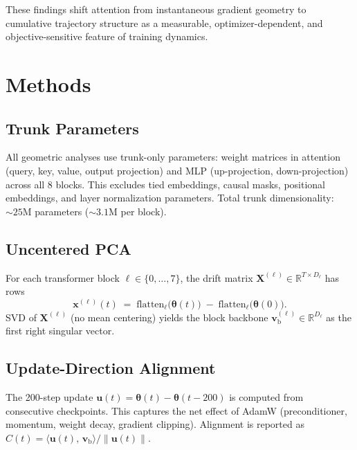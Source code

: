 \documentclass[11pt,a4paper]{article}
\newcommand{\vb}{\mathbf{v}_{\mathrm{b}}}
\newcommand{\R}{\mathbb{R}}
\newcommand{\inner}[2]{\langle #1,\, #2 \rangle}
\newcommand{\norm}[1]{\lVert #1 \rVert}
\begin{document}
These findings shift attention from instantaneous gradient geometry to cumulative trajectory structure as a measurable, optimizer-dependent, and objective-sensitive feature of training dynamics.


\section{Methods}\label{sec:methods}

\subsection{Trunk Parameters}

All geometric analyses use trunk-only parameters: weight matrices in attention
(query, key, value, output projection) and MLP (up-projection, down-projection)
across all 8 blocks.  This excludes tied embeddings, causal masks, positional
embeddings, and layer normalization parameters.  Total trunk dimensionality:
${\sim}25\text{M}$ parameters (${\sim}3.1\text{M}$ per block).

\subsection{Uncentered PCA}\label{sec:methods-pca}

For each transformer block $\ell \in \{0, \ldots, 7\}$, the drift matrix
$\mathbf{X}^{(\ell)} \in \R^{T \times D_\ell}$ has rows
\begin{equation}
    \mathbf{x}^{(\ell)}(t)
    \;=\; \text{flatten}_\ell\bigl(\bm{\theta}(t)\bigr)
    \;-\; \text{flatten}_\ell\bigl(\bm{\theta}(0)\bigr).
\end{equation}
SVD of $\mathbf{X}^{(\ell)}$ (no mean centering) yields the block backbone
$\vb^{(\ell)} \in \R^{D_\ell}$ as the first right singular vector.

\subsection{Update-Direction Alignment}

The 200-step update $\mathbf{u}(t) = \bm{\theta}(t) - \bm{\theta}(t - 200)$
is computed from consecutive checkpoints.  This captures the net effect of
AdamW (preconditioner, momentum, weight decay, gradient clipping).  Alignment
is reported as
$C(t) = \inner{\mathbf{u}(t)}{\vb} / \norm{\mathbf{u}(t)}$.
\end{document}
